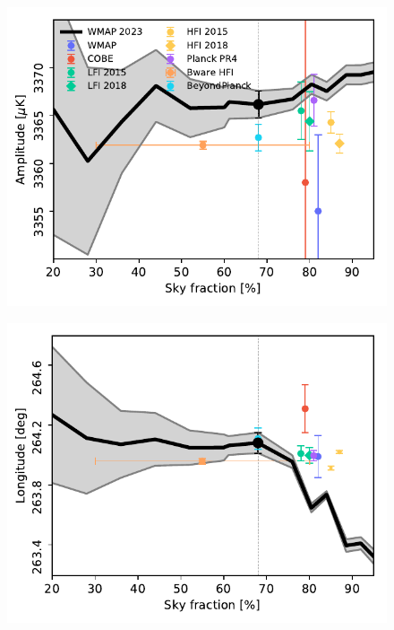 \documentclass[twocolumn]{../../common/aa}
\begin{document}
\begin{figure}
	\includegraphics[width=\columnwidth]{figures/dip_amplitude.pdf}
\end{figure}
\begin{figure}
	\includegraphics[width=\columnwidth]{figures/dip_longitude.pdf}
\end{figure}
\end{document}
